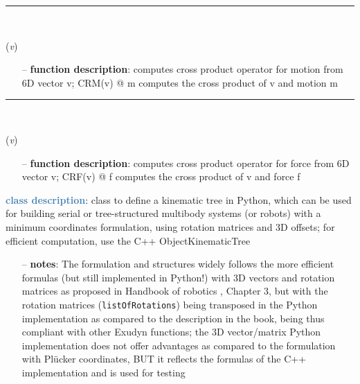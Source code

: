 \begin{itemize}[leftmargin=1.4cm]
\begin{itemize}[leftmargin=1.4cm]
\begin{itemize}[leftmargin=0.5cm]
\begin{itemize}[leftmargin=1.4cm]
\begin{itemize}[leftmargin=1.4cm]
\begin{itemize}[leftmargin=0.5cm]
\begin{itemize}[leftmargin=1.4cm]
\begin{itemize}[leftmargin=0.5cm]
\begin{itemize}[leftmargin=1.4cm]
\begin{itemize}[leftmargin=1.4cm]
\begin{itemize}[leftmargin=1.4cm]
%
\noindent\rule{8cm}{0.75pt}\vspace{1pt} \\ 
\begin{flushleft}
\label{sec:kinematicTree:CRM}
({\it v})
\end{flushleft}
\setlength{\itemindent}{0.7cm}
\begin{itemize}[leftmargin=0.7cm]
\item[--]
{\bf function description}: computes cross product operator for motion from 6D vector v; CRM(v) @ m computes the cross product of v and motion m
\vspace{12pt}\end{itemize}
%
\noindent\rule{8cm}{0.75pt}\vspace{1pt} \\ 
\begin{flushleft}
\label{sec:kinematicTree:CRF}
({\it v})
\end{flushleft}
\setlength{\itemindent}{0.7cm}
\begin{itemize}[leftmargin=0.7cm]
\item[--]
{\bf function description}: computes cross product operator for force from 6D vector v; CRF(v) @ f computes the cross product of v and force f
\vspace{12pt}\end{itemize}
%
\noindent\textcolor{steelblue}{{\bf class description}}:  class to define a kinematic tree in Python, which can be used for building serial or tree-structured multibody systems
         (or robots) with a minimum coordinates formulation, using rotation matrices and 3D offsets; for efficient computation, use the C++ ObjectKinematicTree
\setlength{\itemindent}{0.7cm}
\begin{itemize}[leftmargin=0.7cm]
\item[--]
{\bf notes}: The formulation and structures widely follows the more efficient formulas (but still implemented in Python!) with 3D vectors and rotation matrices as proposed in Handbook of robotics \cite{Siciliano2016}, Chapter 3, but with the rotation matrices (\texttt{listOfRotations}) being transposed in the Python implementation as compared to the description in the book, being thus compliant with other Exudyn functions; the 3D vector/matrix Python implementation does not offer advantages as compared to the formulation with Pl\"ucker coordinates, BUT it reflects the formulas of the C++ implementation and is used for testing

\end{itemize}
\end{itemize}
\end{itemize}
\end{itemize}
\end{itemize}
\end{itemize}
\end{itemize}
\end{itemize}
\end{itemize}
\end{itemize}
\end{itemize}
\end{itemize}
